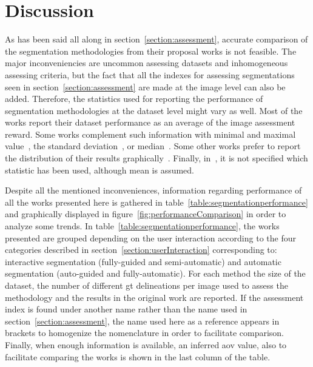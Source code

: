 \documentclass[authoryear,preprint,review,12pt]{elsarticle}
\begin{document}
\section{Discussion}\label{discussion}

As has been said all along in section~\ref{section:assessment}, accurate comparison of the segmentation methodologies from their proposal works is not feasible. The major inconveniencies are uncommon assessing datasets and inhomogeneous assessing criteria, but the fact that all the indexes for assessing segmentations seen in section~\ref{section:assessment} are made at the image level can also be added. Therefore, the statistics used for reporting the performance of segmentation methodologies at the dataset level might vary as well. Most of the works report their dataset performance as an average of the image assessment reward. Some works complement such information with minimal and maximal value~\cite{Gomez:2010p14339}, the standard deviation~\cite{AlemanFlores:2007p14310,Cui:2009p14325,Zhang:2010p14317,hao2012combining,Huang:2012p14313,Liu:2010p14328}, or median~\cite{AlemanFlores:2007p14310,hao2012combining}. Some other works prefer to report the distribution of their results graphically~\cite{massich2010lesion,Gao:2012p14336,Yeh:2009p11985}. Finally, in~\cite{Huang:2007p6100,Shan:2012p14347}, it is not specified which statistic has been used, although mean is assumed.

Despite all the mentioned inconveniences, information regarding performance of all the works presented here is gathered in table~\ref{table:segmentationperformance} and graphically displayed in figure~\ref{fig:performanceComparison} in order to analyze some trends. In table~\ref{table:segmentationperformance}, the works presented are grouped depending on the user interaction according to the four categories described in section~\ref{section:userInteraction} corresponding to: interactive segmentation (fully-guided and semi-automatic) and automatic segmentation (auto-guided and fully-automatic). For each method the size of the dataset, the number of different \ac{gt} delineations per image used to assess the methodology and the results in the original work are reported. If the assessment index is found under another name rather than the name used in section~\ref{section:assessment}, the name used here as a reference appears in brackets to homogenize the nomenclature in order to facilitate comparison.
Finally, when enough information is available,  an inferred \ac{aov} value, also to facilitate comparing the works is shown in the last column of the table.
\end{document}
